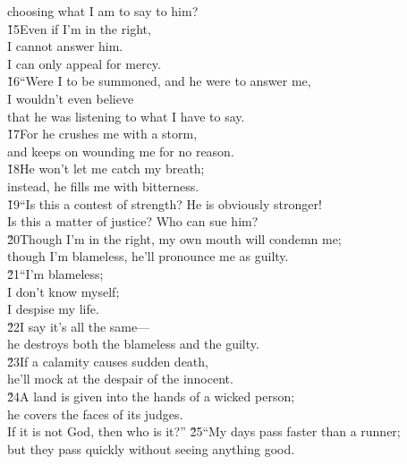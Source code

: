 \begin{poetry}
\poemll    choosing what I am to say to him? \\
\poeml \v{15}Even if I'm in the right, \\
\poemll    I cannot answer him. \\
\poemlll       I can only appeal for mercy. \\
\poeml \v{16}``Were I to be summoned, and he were to answer me, \\
\poemll    I wouldn't even believe \\
\poemlll       that he was listening to what I have to say. \\
\poeml \v{17}For he crushes me with a storm, \\
\poemll    and keeps on wounding me for no reason. \\
\poeml \v{18}He won't let me catch my breath; \\
\poemll    instead, he fills me with bitterness. \\
\poeml \v{19}``Is this a contest of strength? He is obviously stronger! \\
\poemll    Is this a matter of justice? Who can sue him? \\
\poeml \v{20}Though I'm in the right, my own mouth will condemn me; \\
\poemll    though I'm blameless, he'll pronounce me as guilty. \\
\poeml \v{21}``I'm blameless; \\
\poemll    I don't know myself; \\
\poemlll       I despise my life. \\
\poeml \v{22}I say it's all the same--- \\
\poemll    he destroys both the blameless and the guilty. \\
\poeml \v{23}If a calamity causes sudden death, \\
\poemll    he'll mock at the despair of the innocent. \\
\poeml \v{24}A land is given into the hands of a wicked person; \\
\poemll    he covers the faces of its judges. \\
\poemlll       If it is not God, then who is it?''
\poeml \v{25}``My days pass faster than a runner; \\
\poemll    but they pass quickly without seeing anything good. \\

\end{poetry}

